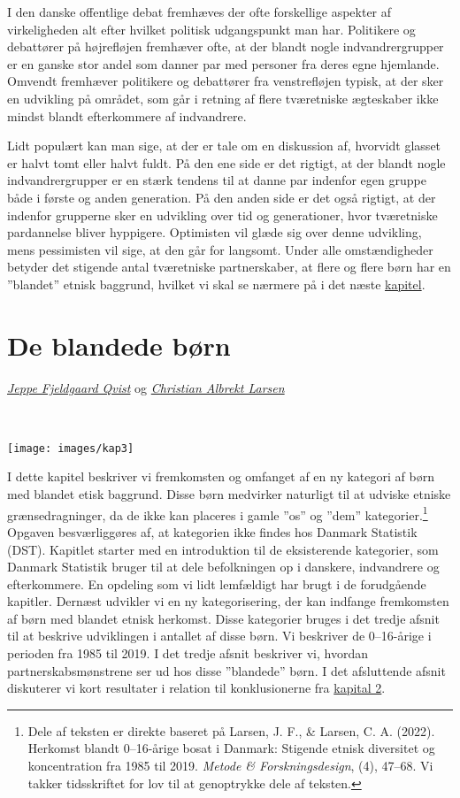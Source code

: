 \documentclass[
]{book}
\begin{document}
I den danske offentlige debat fremhæves der ofte forskellige aspekter af virkeligheden alt efter hvilket politisk udgangspunkt man har. Politikere og debattører på højrefløjen fremhæver ofte, at der blandt nogle indvandrergrupper er en ganske stor andel som danner par med personer fra deres egne hjemlande. Omvendt fremhæver politikere og debattører fra venstrefløjen typisk, at der sker en udvikling på området, som går i retning af flere tværetniske ægteskaber ikke mindst blandt efterkommere af indvandrere.

Lidt populært kan man sige, at der er tale om en diskussion af, hvorvidt glasset er halvt tomt eller halvt fuldt. På den ene side er det rigtigt, at der blandt nogle indvandrergrupper er en stærk tendens til at danne par indenfor egen gruppe både i første og anden generation. På den anden side er det også rigtigt, at der indenfor grupperne sker en udvikling over tid og generationer, hvor tværetniske pardannelse bliver hyppigere. Optimisten vil glæde sig over denne udvikling, mens pessimisten vil sige, at den går for langsomt. Under alle omstændigheder betyder det stigende antal tværetniske partnerskaber, at flere og flere børn har en ''blandet'' etnisk baggrund, hvilket vi skal se nærmere på i det næste \hyperref[kap3]{kapitel}.

\chapter{De blandede børn}\label{kap3}

\thispagestyle{empty}

\emph{\href{https://vbn.aau.dk/da/persons/jeppefl}{Jeppe Fjeldgaard Qvist}} og \emph{\href{https://vbn.aau.dk/en/persons/albrekt}{Christian Albrekt Larsen}}

~~~~

\texttt{[image: images/kap3]}

\newpage

I dette kapitel beskriver vi fremkomsten og omfanget af en ny kategori af børn med blandet etisk baggrund. Disse børn medvirker naturligt til at udviske etniske grænsedragninger, da de ikke kan placeres i gamle ''os'' og ''dem'' kategorier.\footnote{Dele af teksten er direkte baseret på Larsen, J. F., \& Larsen, C. A. (2022). Herkomst blandt 0--16-årige bosat i Danmark: Stigende etnisk diversitet og koncentration fra 1985 til 2019. \emph{Metode \& Forskningsdesign}, (4), 47--68. Vi takker tidsskriftet for lov til at genoptrykke dele af teksten.} Opgaven besværliggøres af, at kategorien ikke findes hos Danmark Statistik (DST). Kapitlet starter med en introduktion til de eksisterende kategorier, som Danmark Statistik bruger til at dele befolkningen op i danskere, indvandrere og efterkommere. En opdeling som vi lidt lemfældigt har brugt i de forudgående kapitler. Dernæst udvikler vi en ny kategorisering, der kan indfange fremkomsten af børn med blandet etnisk herkomst. Disse kategorier bruges i det tredje afsnit til at beskrive udviklingen i antallet af disse børn. Vi beskriver de 0--16-årige i perioden fra 1985 til 2019. I det tredje afsnit beskriver vi, hvordan partnerskabsmønstrene ser ud hos disse ''blandede'' børn. I det afsluttende afsnit diskuterer vi kort resultater i relation til konklusionerne fra \hyperref[kap2]{kapital 2}.
\end{document}
